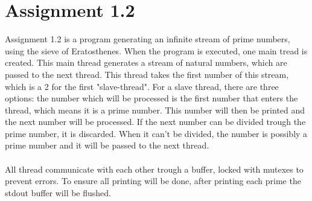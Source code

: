 \documentclass[12pt]{article}
\begin{document}
\section{Assignment 1.2}
Assignment 1.2 is a program generating an infinite stream of prime numbers,
using the sieve of Eratosthenes. When the program is executed, one main tread
is created. This main thread generates a stream of natural numbers, which are
passed to the next thread. This thread takes the first number of this stream,
which is a 2 for the first "slave-thread". For a slave thread, there are three
options: the number which will be processed is the first number that enters the
thread, which means it is a prime number. This number will then be printed and
the next number will be processed. If the next number can be divided trough the
prime number, it is discarded. When it can't be divided, the number is possibly
a prime number and it will be passed to the next thread. \\ \\
All thread communicate with each other trough a buffer, locked with mutexes to
prevent errors. To ensure all printing will be done, after printing each prime
the stdout buffer will be flushed.
\end{document}
